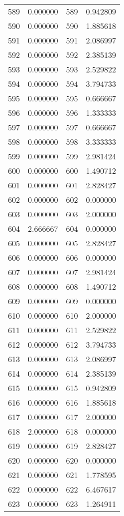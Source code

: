 \documentclass[12pt]{article}
\begin{document}
\begin{longtable}{@{}cccc@{}}
589 & 0.000000 & 589 & 0.942809 \\
590 & 0.000000 & 590 & 1.885618 \\
591 & 0.000000 & 591 & 2.086997 \\
592 & 0.000000 & 592 & 2.385139 \\
593 & 0.000000 & 593 & 2.529822 \\
594 & 0.000000 & 594 & 3.794733 \\
595 & 0.000000 & 595 & 0.666667 \\
596 & 0.000000 & 596 & 1.333333 \\
597 & 0.000000 & 597 & 0.666667 \\
598 & 0.000000 & 598 & 3.333333 \\
599 & 0.000000 & 599 & 2.981424 \\
600 & 0.000000 & 600 & 1.490712 \\
601 & 0.000000 & 601 & 2.828427 \\
602 & 0.000000 & 602 & 0.000000 \\
603 & 0.000000 & 603 & 2.000000 \\
604 & 2.666667 & 604 & 0.000000 \\
605 & 0.000000 & 605 & 2.828427 \\
606 & 0.000000 & 606 & 0.000000 \\
607 & 0.000000 & 607 & 2.981424 \\
608 & 0.000000 & 608 & 1.490712 \\
609 & 0.000000 & 609 & 0.000000 \\
610 & 0.000000 & 610 & 2.000000 \\
611 & 0.000000 & 611 & 2.529822 \\
612 & 0.000000 & 612 & 3.794733 \\
613 & 0.000000 & 613 & 2.086997 \\
614 & 0.000000 & 614 & 2.385139 \\
615 & 0.000000 & 615 & 0.942809 \\
616 & 0.000000 & 616 & 1.885618 \\
617 & 0.000000 & 617 & 2.000000 \\
618 & 2.000000 & 618 & 0.000000 \\
619 & 0.000000 & 619 & 2.828427 \\
620 & 0.000000 & 620 & 0.000000 \\
621 & 0.000000 & 621 & 1.778595 \\
622 & 0.000000 & 622 & 6.467617 \\
623 & 0.000000 & 623 & 1.264911 \\

\end{longtable}
\end{document}
